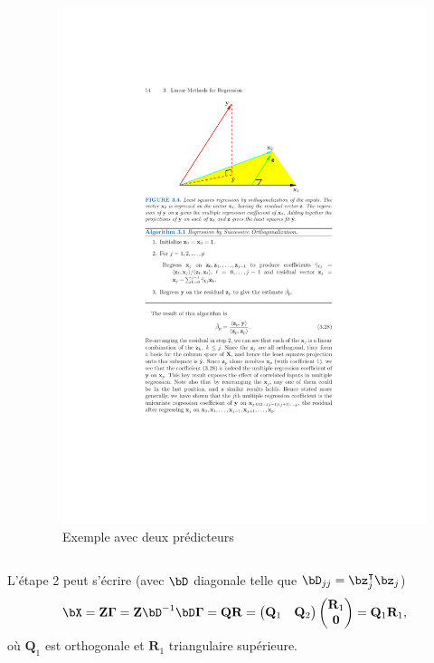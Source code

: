 \documentclass{beamer}\usepackage[]{graphicx}\usepackage[]{color}
\begin{document}
\begin{frame}
\begin{columns}[c]
\begin{column}{.45\textwidth}
    \end{column}
    \begin{column}{.45\textwidth}
      \begin{figure}[htbp!]
        \centering
        \includegraphics[width=.8\textwidth]{figures/gram_schmidt}
        \caption{Exemple avec deux prédicteurs}
    \end{figure}
    \end{column}
  \end{columns}
  \vspace{-.25cm}
  L'étape 2 peut s'écrire (avec $\bD$ diagonale telle que $\bD_{jj}=
  \bz_j^\intercal \bz_j$)
  \begin{equation*}
    \bX = \mathbf{Z}  \boldsymbol\Gamma = \mathbf{Z}\bD^{-1} \bD\boldsymbol\Gamma
    = \mathbf{Q}\mathbf{R}
    = \begin{pmatrix} \mathbf{Q}_1 & \mathbf{Q}_2\end{pmatrix}
    \begin{pmatrix} \mathbf{R}_1 \\ \mathbf{0}\end{pmatrix}    
    = \mathbf{Q}_1\mathbf{R}_1,
  \end{equation*}
  où $\mathbf{Q}_1$ est orthogonale et $\mathbf{R}_1$ triangulaire supérieure.
\end{frame}
\end{document}
